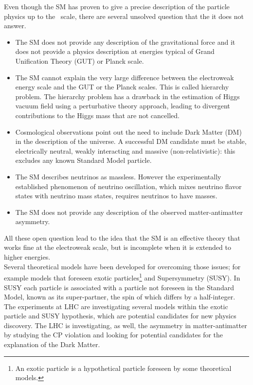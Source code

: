 Even though the SM has proven to give a precise description of the particle physics up to the \TeV~scale, there are several unsolved question that the it does not answer.\\
\begin{itemize}
\item The SM does not provide any description of the gravitational force and it does not provide a physics description at energies typical of Grand Unification Theory (GUT) or Planck scale.
\item The SM cannot explain the very large difference between the electroweak energy scale and the GUT or the Planck scales. This is called hierarchy problem. The hierarchy problem has a drawback in the estimation of Higgs vacuum field using a perturbative theory approach, leading to divergent contributions to the Higgs mass that are not cancelled.
\item Cosmological observations point out the need to include Dark Matter (DM) in the description of the universe. A successful DM candidate must be stable, electrically neutral, weakly interacting and massive (non-relativistic): this excludes any known Standard Model particle.
\item The SM describes neutrinos as massless. However the experimentally established phenomenon of neutrino oscillation, which mixes neutrino flavor states with neutrino mass states, requires neutrinos to have masses.
\item The SM does not provide any description of the observed matter-antimatter asymmetry.
\end{itemize}
All these open question lead to the idea that the SM is an effective theory that works fine at the electroweak scale, but is incomplete when it is extended to higher energies.\\
Several theoretical models have been developed for overcoming those issues; for example models that foreseen exotic particles\footnote{An exotic particle is a hypothetical particle foreseen by some theoretical models.} and Supersymmetry (SUSY). In SUSY each particle is associated with a particle not foreseen in the Standard Model, known as its super-partner, the spin of which differs by a half-integer. \\
The experiments at LHC are investigating several models within the exotic particle and SUSY hypothesis, which are potential candidates for new physics discovery. The LHC is investigating, as well, the asymmetry in matter-antimatter by studying the CP violation and looking for potential candidates for the explanation of the Dark Matter. 




